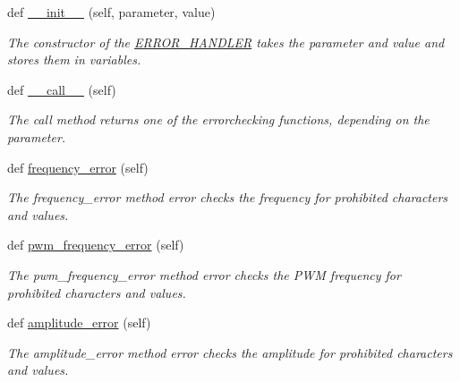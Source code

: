 \begin{DoxyCompactItemize}
\item 
def \hyperlink{classerror__handler_1_1ERROR__HANDLER_a9f273b2b0e26cada4fdcc6db7585c54e}{\+\_\+\+\_\+init\+\_\+\+\_\+} (self, parameter, value)
\begin{DoxyCompactList}\small\item\em The constructor of the \hyperlink{classerror__handler_1_1ERROR__HANDLER}{E\+R\+R\+O\+R\+\_\+\+H\+A\+N\+D\+L\+ER} takes the parameter and value and stores them in variables. \end{DoxyCompactList}\item 
\mbox{\label{classerror__handler_1_1ERROR__HANDLER_a9a8f7843d93624c9148ba3b3dc7922f6}} 
def \hyperlink{classerror__handler_1_1ERROR__HANDLER_a9a8f7843d93624c9148ba3b3dc7922f6}{\+\_\+\+\_\+call\+\_\+\+\_\+} (self)
\begin{DoxyCompactList}\small\item\em The call method returns one of the errorchecking functions, depending on the parameter. \end{DoxyCompactList}\item 
def \hyperlink{classerror__handler_1_1ERROR__HANDLER_aceb3170cea5897e447d9f1d5216a4799}{frequency\+\_\+error} (self)
\begin{DoxyCompactList}\small\item\em The frequency\+\_\+error method error checks the frequency for prohibited characters and values. \end{DoxyCompactList}\item 
def \hyperlink{classerror__handler_1_1ERROR__HANDLER_a99f49e4f104fb465f742f19b64686630}{pwm\+\_\+frequency\+\_\+error} (self)
\begin{DoxyCompactList}\small\item\em The pwm\+\_\+frequency\+\_\+error method error checks the P\+WM frequency for prohibited characters and values. \end{DoxyCompactList}\item 
def \hyperlink{classerror__handler_1_1ERROR__HANDLER_a7860f43efd026175f33bf333e80a586b}{amplitude\+\_\+error} (self)
\begin{DoxyCompactList}\small\item\em The amplitude\+\_\+error method error checks the amplitude for prohibited characters and values. \end{DoxyCompactList}\item 

\end{DoxyCompactItemize}

